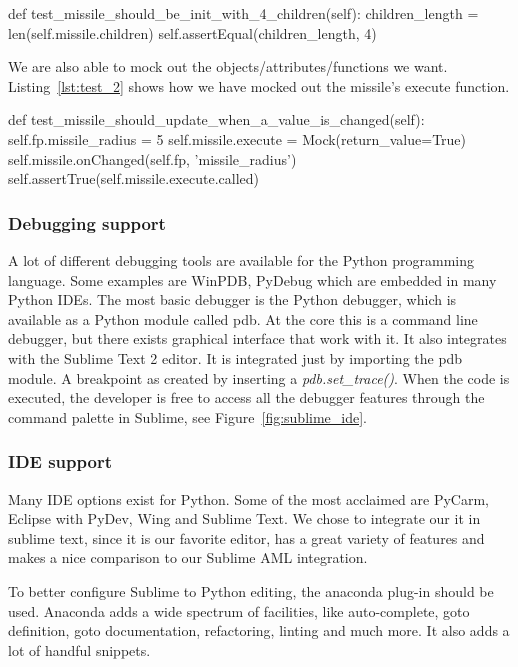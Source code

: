 \begin{python}[caption={Missile test 1},label={lst:test_1}]
   def test_missile_should_be_init_with_4_children(self):
        children_length = len(self.missile.children)
        self.assertEqual(children_length, 4)
 \end{python}

We are also able to mock out the objects/attributes/functions we want. Listing~\ref{lst:test_2} shows how we have mocked out the missile's execute function.

\begin{python}[caption={Missile test 2},label={lst:test_2}]
    def test_missile_should_update_when_a_value_is_changed(self):
        self.fp.missile_radius = 5
        self.missile.execute = Mock(return_value=True)
        self.missile.onChanged(self.fp, 'missile_radius')
        self.assertTrue(self.missile.execute.called)
\end{python}


\subsubsection{Debugging support} %
\label{ssub:debugging_support}
A lot of different debugging tools are available for the Python programming language. Some examples are WinPDB, PyDebug which are embedded in many Python IDEs. The most basic debugger is the Python debugger, which is available as a Python module called pdb. At the core this is a command line debugger, but there exists graphical interface that work with it. It also integrates with the Sublime Text 2 editor. It is integrated just by importing the pdb module. A breakpoint as created by inserting a \textit{pdb.set\_trace()}. When the code is executed, the developer is free to access all the debugger features through the command palette in Sublime, see Figure~\ref{fig:sublime_ide}.

\subsubsection{IDE support} %
Many IDE options exist for Python. Some of the most acclaimed are PyCarm, Eclipse with PyDev, Wing and Sublime Text. We chose to integrate our it in sublime text, since it is our favorite editor, has a great variety of features and makes a nice comparison to our Sublime AML integration.

To better configure Sublime to Python editing, the anaconda \citep{anaconda} plug-in should be used. Anaconda adds a wide spectrum of facilities, like auto-complete, goto definition, goto documentation, refactoring, linting and much more. It also adds a lot of handful snippets.

